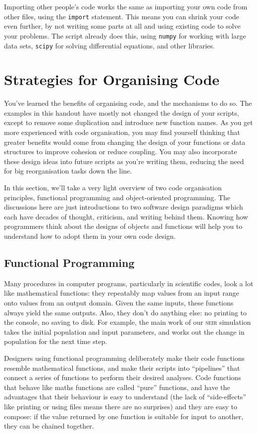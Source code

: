 \documentclass[a4paper]{article}
\begin{document}
Importing other people's code works the same as importing your own code from other files, using the \texttt{import} statement.
This means you can shrink your code even further, by not writing some parts at all and using existing code to solve your problems.
The script already does this, using \texttt{numpy} for working with large data sets, \texttt{scipy} for solving differential equations, and other libraries.

\section{Strategies for Organising Code}
You've learned the benefits of organising code, and the mechanisms to do so.
The examples in this handout have mostly not changed the design of your scripts, except to remove some duplication and introduce new function names.
As you get more experienced with code organisation, you may find yourself thinking that greater benefits would come from changing the design of your functions or data structures to improve cohesion or reduce coupling.
You may also incorporate these design ideas into future scripts as you're writing them, reducing the need for big reorganisation tasks down the line.

In this section, we'll take a very light overview of two code organisation principles, functional programming and object-oriented programming.
The discussions here are just introductions to two software design paradigms which each have decades of thought, criticism, and writing behind them.
Knowing how programmers think about the designs of objects and functions will help you to understand how to adopt them in your own code design.

\subsection{Functional Programming}
Many procedures in computer programs, particularly in scientific codes, look a lot like mathematical functions: they repeatably map values from an input range onto values from an output domain.
Given the same inputs, these functions always yield the same outputs.
Also, they don't do anything else: no printing to the console, no saving to disk.
For example, the main work of our \textsc{seir} simulation takes the initial population and input parameters, and works out the change in population for the next time step.

Designers using functional programming deliberately make their code functions resemble mathematical functions, and make their scripts into ``pipelines'' that connect a series of functions to perform their desired analyses.
Code functions that behave like maths functions are called ``pure'' functions, and have the advantages that their behaviour is easy to understand (the lack of ``side-effects'' like printing or using files means there are no surprises) and they are easy to compose: if the value returned by one function is suitable for input to another, they can be chained together.
\end{document}
